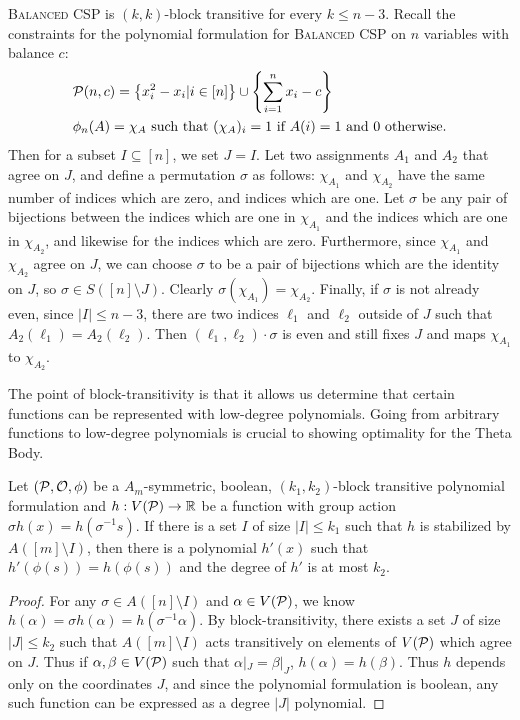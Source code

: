 \begin{example}\label{ex:bcsp-blocktransitive}
\textsc{Balanced CSP} is $(k,k)$-block transitive for every $k \leq n-3$. Recall the constraints for the polynomial formulation for \textsc{Balanced CSP} on $n$ variables with balance $c$:
\begin{align*}
&\mathcal P(n,c) = \left\{x_i^2 - x_i | i \in [n]\right\} \cup \left\{\sum_{i=1}^n x_i - c\right\} \\
&\phi_n(A) = \chi_A \text{ such that } (\chi_A)_i = 1 \text{ if $A(i) = 1$ and $0$ otherwise.}
\end{align*}
Then for a subset $I \subseteq [n]$, we set $J = I$. Let two assignments $A_1$ and $A_2$ that agree on $J$, and define a permutation $\sigma$ as follows: $\chi_{A_1}$ and $\chi_{A_2}$ have the same number of indices which are zero, and indices which are one. Let $\sigma$ be any pair of bijections between the indices which are one in $\chi_{A_1}$ and the indices which are one in $\chi_{A_2}$, and likewise for the indices which are zero. Furthermore, since $\chi_{A_1}$ and $\chi_{A_2}$ agree on $J$, we can choose $\sigma$ to be a pair of bijections which are the identity on $J$, so $\sigma \in S([n] \setminus J)$. Clearly $\sigma(\chi_{A_1}) = \chi_{A_2}$. Finally, if $\sigma$ is not already even, since $|I| \leq n-3$, there are two indices $\ell_1$ and $\ell_2$ outside of $J$ such that $A_2(\ell_1) = A_2(\ell_2)$. Then $(\ell_1, \ell_2) \cdot \sigma$ is even and still fixes $J$ and maps $\chi_{A_1}$ to $\chi_{A_2}$.
\end{example}

The point of block-transitivity is that it allows us determine that certain functions can be represented with low-degree polynomials. Going from arbitrary functions to low-degree polynomials is crucial to showing optimality for the Theta Body.  
\begin{lemma}
Let $(\mathcal P, \mathcal O, \phi)$ be a $A_m$-symmetric, boolean, $(k_1,k_2)$-block transitive polynomial formulation and $h: V(\mathcal P) \rightarrow \mathbb R$ be a function with group action $\sigma h(x) = h(\sigma^{-1} s)$. If there is a set $I$ of size $|I| \leq k_1$ such that $h$ is stabilized by $A([m] \setminus I)$, then there is a polynomial $h'(x)$ such that $h'(\phi(s)) = h(\phi(s))$ and the degree of $h'$ is at most $k_2$. 
\end{lemma}
\begin{proof}
For any $\sigma \in A([n] \setminus I)$ and $\alpha \in V(\mathcal P)$, we know $h(\alpha) = \sigma h(\alpha) = h(\sigma^{-1} \alpha)$. By block-transitivity, there exists a set $J$ of size $|J| \leq k_2$ such that $A([m]\setminus I)$ acts transitively on elements of $V(\mathcal P)$ which agree on $J$. Thus if $\alpha,\beta \in V(\mathcal P)$ such that $\alpha|_J = \beta|_J$, $h(\alpha) = h(\beta)$. Thus $h$ depends only on the coordinates $J$, and since the polynomial formulation is boolean, any such function can be expressed as a degree $|J|$ polynomial. 
\end{proof} 

